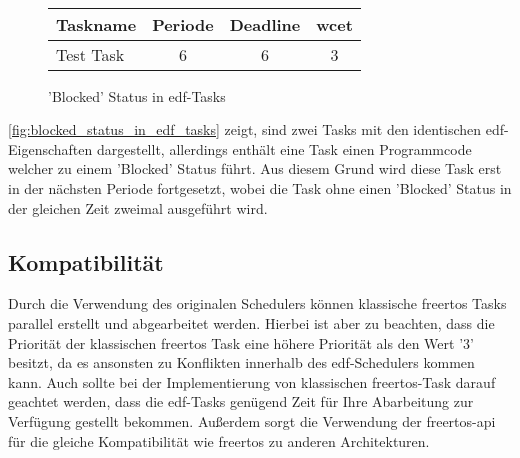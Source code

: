 \documentclass[../EDF Master Thesis.tex]{subfiles}
\begin{document}
\begin{figure}[H]
\\

        \vspace {0.5cm}
        \begin{tabular}{l|c|c|c}
            Taskname & Periode & Deadline & \ac{wcet} \\
            \hline
            Test Task & 6 & 6 & 3 \\
        \end{tabular}
        \caption{'Blocked' Status in \ac{edf}-Tasks}
        \label{fig:blocked_status_in_edf_tasks}
    \end{figure}

    \autoref{fig:blocked_status_in_edf_tasks} zeigt, sind zwei Tasks mit den identischen \ac{edf}-Eigenschaften dargestellt, allerdings enthält eine Task einen Programmcode welcher zu einem 'Blocked' Status führt.
    Aus diesem Grund wird diese Task erst in der nächsten Periode fortgesetzt, wobei die Task ohne einen 'Blocked' Status in der gleichen Zeit zweimal ausgeführt wird.


\subsection{Kompatibilität}

    Durch die Verwendung des originalen Schedulers können klassische \ac{freertos} Tasks parallel erstellt und abgearbeitet werden.
    Hierbei ist aber zu beachten, dass die Priorität der klassischen \ac{freertos} Task eine höhere Priorität als den Wert '3' besitzt, da es ansonsten zu Konflikten innerhalb des \ac{edf}-Schedulers kommen kann.
    Auch sollte bei der Implementierung von klassischen \ac{freertos}-Task darauf geachtet werden, dass die \ac{edf}-Tasks genügend Zeit für Ihre Abarbeitung zur Verfügung gestellt bekommen.
    Außerdem sorgt die Verwendung der \ac{freertos}-\ac{api} für die gleiche Kompatibilität wie \ac{freertos} zu anderen Architekturen. 
\end{document}
